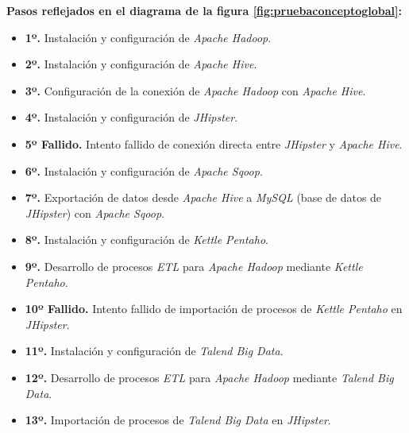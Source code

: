\par

\textbf{Pasos reflejados en el diagrama de la figura \ref{fig:pruebaconceptoglobal}:}
\begin{itemize}
\item \textbf{1º.} Instalación y configuración de \textit{Apache Hadoop}.
\item \textbf{2º.} Instalación y configuración de \textit{Apache Hive}.
\item \textbf{3º.} Configuración de la conexión de \textit{Apache Hadoop} con \textit{Apache Hive}.
\item \textbf{4º.} Instalación y configuración de \textit{JHipster}.
\item \textbf{5º Fallido.} Intento fallido de conexión directa entre \textit{JHipster} y \textit{Apache Hive}.
\item \textbf{6º.} Instalación y configuración de \textit{Apache Sqoop}. 
\item \textbf{7º.} Exportación de datos desde \textit{Apache Hive} a \textit{MySQL} (base de datos de \textit{JHipster}) con \textit{Apache Sqoop}.
\item \textbf{8º.} Instalación y configuración de \textit{Kettle Pentaho}.
\item \textbf{9º.} Desarrollo de procesos \textit{ETL} para \textit{Apache Hadoop} mediante \textit{Kettle Pentaho}.
\item \textbf{10º Fallido.} Intento fallido de importación de procesos de \textit{Kettle Pentaho} en \textit{JHipster}.
\item \textbf{11º.} Instalación y configuración de\textit{ Talend Big Data}.
\item \textbf{12º.} Desarrollo de procesos \textit{ETL} para \textit{Apache Hadoop }mediante \textit{Talend Big Data}.
\item \textbf{13º.} Importación de procesos de \textit{Talend Big Data} en \textit{JHipster}.
\end{itemize}


\par
